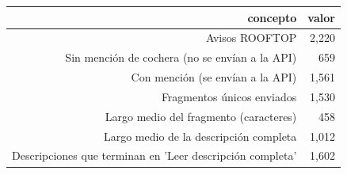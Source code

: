 \begin{tabular}{rr}
\toprule
concepto & valor \\
\midrule
Avisos ROOFTOP & 2,220 \\
Sin mención de cochera (no se envían a la API) & 659 \\
Con mención (se envían a la API) & 1,561 \\
Fragmentos únicos enviados & 1,530 \\
Largo medio del fragmento (caracteres) & 458 \\
Largo medio de la descripción completa & 1,012 \\
Descripciones que terminan en 'Leer descripción completa' & 1,602 \\
\bottomrule
\end{tabular}